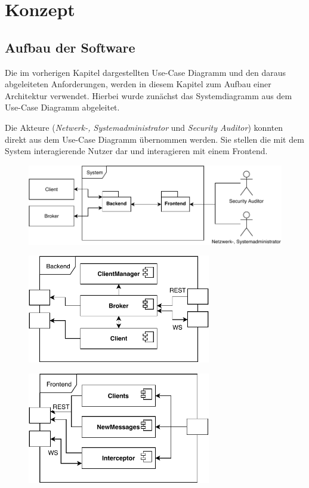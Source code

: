 \chapter{Konzept}
\section{Aufbau der Software}
    Die im vorherigen Kapitel dargestellten Use-Case Diagramm und den daraus abgeleiteten Anforderungen, werden in diesem Kapitel zum Aufbau einer Architektur verwendet.
    Hierbei wurde zunächst das Systemdiagramm aus dem Use-Case Diagramm abgeleitet.
    
    Die Akteure (\emph{Netwerk-, Systemadministrator} und \emph{Security Auditor}) konnten direkt aus dem Use-Case Diagramm übernommen werden.
    Sie stellen die mit dem System interagierende Nutzer dar und interagieren mit einem Frontend.
    \begin{figure}[h]%
        \centering
        \includegraphics[width=14cm]{tex/bilder/4_konzept/Systemdiagram.pdf}
        \label{fig:system_all}
    \end{figure}
    \begin{figure}[h]%
        \centering
        \includegraphics[width=8cm]{tex/bilder/4_konzept/Systemdiagramm_Backend.pdf}
        \label{fig:system_backend}
        \end{figure}
    \begin{figure}[h]%
        \centering
        \includegraphics[width=8cm]{tex/bilder/4_konzept/Systemdiagramm_Frontend.pdf}
        \label{fig:system_frontend}
    \end{figure}

